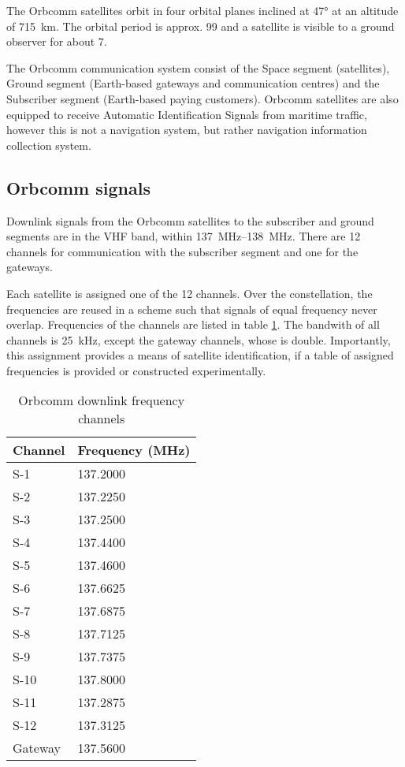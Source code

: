 The Orbcomm satellites orbit in four orbital planes inclined at \ang{47} at an altitude of \qty{715}{km}. The orbital period is approx. \qty{99}{\min} and a satellite is visible to a ground observer for about \qty{7}{\min}\cite{sat11, sop08}. %

The Orbcomm communication system consist of the Space segment (satellites), Ground segment (Earth-based gateways and communication centres) and the Subscriber segment (Earth-based paying customers)\cite{sop08}. Orbcomm satellites are also equipped to receive Automatic Identification Signals from maritime traffic, however this is not a navigation system, but rather navigation information collection system\cite{sat11}.

\subsection{Orbcomm signals}
Downlink signals from the Orbcomm satellites to the subscriber and ground segments are in the VHF band, within \qtyrange{137}{138}{MHz}. There are 12 channels for communication with the subscriber segment and one for the gateways\cite{sop08}.

Each satellite is assigned one of the 12 channels. Over the constellation, the frequencies are reused in a scheme such that signals of equal frequency never overlap. Frequencies of the channels are listed in table \ref{t_sat_orbcomm_channels}. The bandwith of all channels is \qty{25}{kHz}, except the gateway channels, whose is double\cite{sat13}. Importantly, this assignment provides a means of satellite identification, if a table of assigned frequencies is provided or constructed experimentally.

\begin{table}
\caption{Orbcomm downlink frequency channels\cite{sat13}}
\label{t_sat_orbcomm_channels}
\begin{tabular}{ll}
Channel & Frequency (MHz) \\ \hline
S-1     & 137.2000        \\
S-2     & 137.2250        \\
S-3     & 137.2500        \\
S-4     & 137.4400        \\
S-5     & 137.4600        \\
S-6     & 137.6625        \\
S-7     & 137.6875        \\
S-8     & 137.7125        \\
S-9     & 137.7375        \\
S-10    & 137.8000        \\
S-11    & 137.2875        \\
S-12    & 137.3125        \\
Gateway & 137.5600       
\end{tabular}
\end{table}

